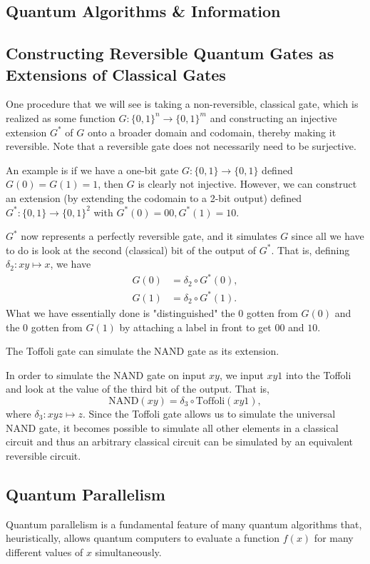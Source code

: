 \documentclass{article}
\theoremstyle{definition}
\begin{document}
\subsection*{Quantum Algorithms \& Information}

\subsection*{Constructing Reversible Quantum Gates as Extensions of Classical Gates}
One procedure that we will see is taking a non-reversible, classical gate, which is realized as some function $G: \{0, 1\}^n \longrightarrow \{0, 1\}^m$ and constructing an injective extension $G^*$ of $G$ onto a broader domain and codomain, thereby making it reversible. Note that a reversible gate does not necessarily need to be surjective.

An example is if we have a one-bit gate $G: \{0, 1\} \longrightarrow \{0, 1\}$ defined $G(0) = G(1) = 1$, then $G$ is clearly not injective. However, we can construct an extension (by extending the codomain to a 2-bit output) defined $G^*: \{0, 1\} \longrightarrow \{0, 1\}^2$ with $G^*(0) = 00, G^*(1) = 10$.

$G^*$ now represents a perfectly reversible gate, and it simulates $G$ since all we have to do is look at the second (classical) bit of the output of $G^*$. That is, defining $\delta_2: xy \mapsto x$, we have
\begin{align*}
  G(0) & = \delta_2 \circ G^* (0), \\
  G(1) & = \delta_2 \circ G^* (1).
\end{align*}
What we have essentially done is "distinguished" the $0$ gotten from $G(0)$ and the $0$ gotten from $G(1)$ by attaching a label in front to get $00$ and $10$.

The Toffoli gate can simulate the NAND gate as its extension.

In order to simulate the NAND gate on input $xy$, we input $xy1$ into the Toffoli and look at the value of the third bit of the output. That is,
\[\text{NAND}(xy) = \delta_3 \circ \text{Toffoli}(xy1),\]
where $\delta_3: xyz \mapsto z$. Since the Toffoli gate allows us to simulate the universal NAND gate, it becomes possible to simulate all other elements in a classical circuit and thus an arbitrary classical circuit can be simulated by an equivalent reversible circuit.

\subsection*{Quantum Parallelism}
Quantum parallelism is a fundamental feature of many quantum algorithms that, heuristically, allows quantum computers to evaluate a function $f(x)$ for many different values of $x$ simultaneously.
\end{document}
